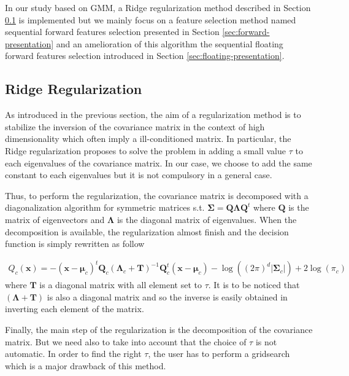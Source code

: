 \documentclass[a4paper]{article}
\begin{document}
    In our study based on GMM, a Ridge regularization method described in Section \ref{sec:regularization} is implemented but we mainly focus on a feature selection method named sequential forward features selection presented in Section \ref{sec:forward-presentation} and an amelioration of this algorithm the sequential floating forward features selection introduced in Section \ref{sec:floating-presentation}.


    \subsection{Ridge Regularization}
    \label{sec:regularization}

    As introduced in the previous section, the aim of a regularization method is to stabilize the inversion of the covariance matrix in the context of high dimensionality which often imply a ill-conditioned matrix. In particular, the Ridge regularization proposes to solve the problem in adding a small value $\tau$ to each eigenvalues of the covariance matrix. In our case, we choose to add the same constant to each eigenvalues but it is not compulsory in a general case.

    Thus, to perform the regularization, the covariance matrix is decomposed with a diagonalization algorithm for symmetric matrices s.t. $\boldsymbol{\Sigma} = \mathbf{Q} \boldsymbol{\Lambda} \mathbf{Q}^t$ where $\mathbf{Q}$ is the matrix of eigenvectors and $\boldsymbol{\Lambda}$ is the diagonal matrix of eigenvalues. When the decomposition is available, the regularization almost finish and the decision function is simply rewritten as follow

    \begin{align}
        Q_c(\mathbf{x}) = - (\mathbf{x} - \boldsymbol{\mu}_c)^t \mathbf{Q}_c (\boldsymbol{\Lambda}_c + \mathbf{T})^{-1} \mathbf{Q}_c^t (\mathbf{x} - \boldsymbol{\mu}_c) - \log ((2\pi)^d|\boldsymbol{\Sigma}_c|) + 2 \log (\pi_c)
    \end{align}
    where $\mathbf{T}$ is a diagonal matrix with all element set to $\tau$. It is to be noticed that $(\boldsymbol{\Lambda} + \mathbf{T})$ is also a diagonal matrix and so the inverse is easily obtained in inverting each element of the matrix.

    Finally, the main step of the regularization is the decomposition of the covariance matrix. But we need also to take into account that the choice of $\tau$ is not automatic. In order to find the right $\tau$, the user has to perform a gridsearch which is a major drawback of this method.
\end{document}
